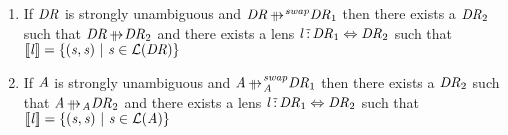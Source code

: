 \documentclass[numbers,10pt,preprint\ifanon ,nocopyrightspace\fi]{sigplanconf}
\begin{document}
\begin{lemma}
  \label{lem:swap-unimportance-identity}
  \leavevmode
  \begin{enumerate}
  \item If $\mathit{DR}$ is strongly unambiguous and
    $\DNFRegex \ParallelRewriteSwap \DNFRegex_1$ then there exists a
    $\mathit{DR}_2$ such that $\DNFRegex \ParallelRewrite \DNFRegex_2$
    and there exists a lens
    $\mathit{l} \,\tilde{:}\, \mathit{DR}_1 \Leftrightarrow \mathit{DR}_2$
    such that
    $[ \! [\mathit{l}] \! ] = \{(\mathit{s},\mathit{s})
      ~|~ \mathit{s} \in \mathcal{L}(\mathit{DR})\}$
  \item If $\mathit{A}$ is strongly unambiguous and
    $\Atom \ParallelRewriteSwapAtom \DNFRegex_1$ then there exists a
    $\mathit{DR}_2$ such that $\Atom \ParallelRewriteAtom \DNFRegex_2$
    and there exists a lens
    $\mathit{l} \,\tilde{:}\, \mathit{DR}_1 \Leftrightarrow \mathit{DR}_2$
    such that
    $[ \! [\mathit{l}] \! ] = \{(\mathit{s},\mathit{s})
      ~|~ \mathit{s} \in \mathcal{L}(\mathit{A})\}$
  \end{enumerate}
\end{lemma}
\end{document}
